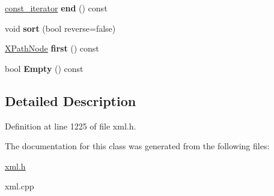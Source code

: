 \begin{DoxyCompactItemize}
\item 
\hypertarget{classphys_1_1xml_1_1XPathNodeSet_adc1ab904e2122928837cc02f1b0a54bf}{
\hyperlink{classphys_1_1xml_1_1XPathNode}{const\_\-iterator} {\bfseries end} () const }
\label{de/dc2/classphys_1_1xml_1_1XPathNodeSet_adc1ab904e2122928837cc02f1b0a54bf}

\item 
\hypertarget{classphys_1_1xml_1_1XPathNodeSet_ad18d6b92f885ee9d862f5008af734559}{
void {\bfseries sort} (bool reverse=false)}
\label{de/dc2/classphys_1_1xml_1_1XPathNodeSet_ad18d6b92f885ee9d862f5008af734559}

\item 
\hypertarget{classphys_1_1xml_1_1XPathNodeSet_a7d3c2d75f154b863a8e81d32e4662b78}{
\hyperlink{classphys_1_1xml_1_1XPathNode}{XPathNode} {\bfseries first} () const }
\label{de/dc2/classphys_1_1xml_1_1XPathNodeSet_a7d3c2d75f154b863a8e81d32e4662b78}

\item 
\hypertarget{classphys_1_1xml_1_1XPathNodeSet_a77e87e2a776cf28501d284532f60e74a}{
bool {\bfseries Empty} () const }
\label{de/dc2/classphys_1_1xml_1_1XPathNodeSet_a77e87e2a776cf28501d284532f60e74a}

\end{DoxyCompactItemize}


\subsection{Detailed Description}


Definition at line 1225 of file xml.h.



The documentation for this class was generated from the following files:\begin{DoxyCompactItemize}
\item 
\hyperlink{xml_8h}{xml.h}\item 
xml.cpp\end{DoxyCompactItemize}
